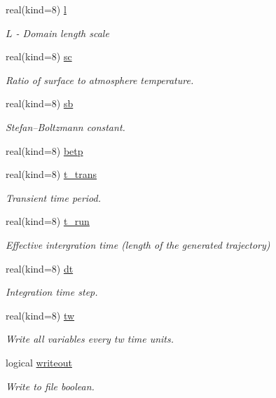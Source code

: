 \begin{DoxyCompactItemize}
real(kind=8) \hyperlink{classparams_aa2b032a17c85d2069ca59212ad8309a1}{l}
\begin{DoxyCompactList}\small\item\em $L$ -\/ Domain length scale \end{DoxyCompactList}\item 
real(kind=8) \hyperlink{classparams_a35c130eb539b9df8c52cc02427913cc0}{sc}
\begin{DoxyCompactList}\small\item\em Ratio of surface to atmosphere temperature. \end{DoxyCompactList}\item 
real(kind=8) \hyperlink{classparams_a7e4a380117958612bc5cf4cac910b483}{sb}
\begin{DoxyCompactList}\small\item\em Stefan–\-Boltzmann constant. \end{DoxyCompactList}\item 
real(kind=8) \hyperlink{classparams_a9ffe87bb8aaab8a0d4f8d5f644b98785}{betp}
\item 
real(kind=8) \hyperlink{classparams_aabf0943afa2272a8bbbd58c49ad0db38}{t\-\_\-trans}
\begin{DoxyCompactList}\small\item\em Transient time period. \end{DoxyCompactList}\item 
real(kind=8) \hyperlink{classparams_a923cab407956c82921069b7ec0e69eb9}{t\-\_\-run}
\begin{DoxyCompactList}\small\item\em Effective intergration time (length of the generated trajectory) \end{DoxyCompactList}\item 
real(kind=8) \hyperlink{classparams_a2d658dc74d6a45a2e71b06bde97df084}{dt}
\begin{DoxyCompactList}\small\item\em Integration time step. \end{DoxyCompactList}\item 
real(kind=8) \hyperlink{classparams_a0955c0296092bb15d2dcd120d72ad479}{tw}
\begin{DoxyCompactList}\small\item\em Write all variables every tw time units. \end{DoxyCompactList}\item 
logical \hyperlink{classparams_affc7b423a975c0e92b62e67ed04edea5}{writeout}
\begin{DoxyCompactList}\small\item\em Write to file boolean. \end{DoxyCompactList}\item 

\end{DoxyCompactItemize}
